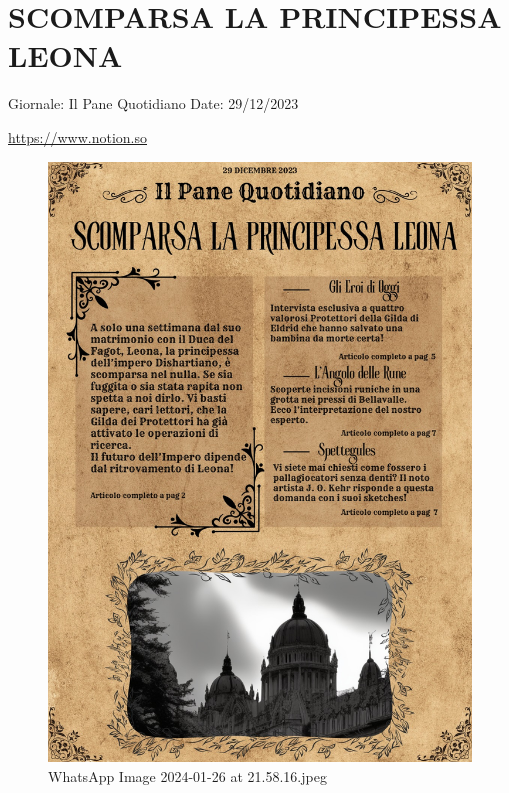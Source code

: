\section{SCOMPARSA LA PRINCIPESSA
LEONA}\label{scomparsa-la-principessa-leona}

Giornale: Il Pane Quotidiano Date: 29/12/2023

\url{https://www.notion.so}

\begin{figure}
\centering
\includegraphics{WhatsApp_Image_2024-01-26_at_21.58.16.jpeg}
\caption{WhatsApp Image 2024-01-26 at 21.58.16.jpeg}
\end{figure}
